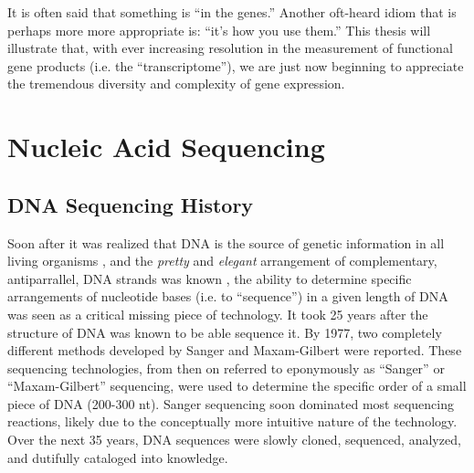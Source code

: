   It is often said that something is ``in the genes.'' Another oft-heard idiom that is perhaps more more appropriate is: ``it's how you use them.'' This thesis will illustrate that, with ever increasing resolution in the measurement of functional gene products (i.e. the ``transcriptome''), we are just now beginning to appreciate the tremendous diversity and complexity of gene expression.

\section{Nucleic Acid Sequencing}
  \label{Intro:sec:Nucleic Acid Sequencing}

  \subsection{DNA Sequencing History}
    \label{Intro:subsec:DNA Sequencing History}

    Soon after it was realized that DNA is the source of genetic information in all living organisms \citep{Watson1953a}, and the \textit{pretty} and \textit{elegant} arrangement of complementary, antiparrallel, DNA strands was known \citep{Watson2012a}, the ability to determine specific arrangements of nucleotide bases (i.e. to ``sequence'') in a given length of DNA was seen as a critical missing piece of technology. It took 25 years after the structure of DNA was known to be able sequence it. By 1977, two completely different methods developed by Sanger \citep{Sanger1975a,Sanger1977b} and Maxam-Gilbert \citep{Maxam1977a} were reported. These sequencing technologies, from then on referred to eponymously as ``Sanger'' or ``Maxam-Gilbert'' sequencing, were used to determine the specific order of a small piece of DNA (200-300 nt). Sanger sequencing soon dominated most sequencing reactions, likely due to the conceptually more intuitive nature of the technology. Over the next 35 years, DNA sequences were slowly cloned, sequenced, analyzed, and dutifully cataloged into knowledge.

